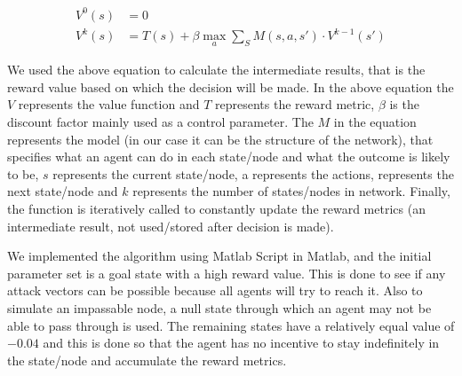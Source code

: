 \begin{equation} 
    \label{eq:infinite_horizon}
    \begin{aligned}
    V^0(s) &= 0 \\
    V^k(s) &= T(s) + \beta \max_a \sum_S M(s,a,s') \cdot V^{k-1}(s')
    \end{aligned}
\end{equation}


We used the above equation to calculate the intermediate results, that is the
reward value based on which the decision will be made. In the above equation the
\( V \) represents the value function and \( T \) represents the reward metric, $\beta$ is the
discount factor mainly used as a control parameter. The \(M\) in the equation
represents the model (in our case it can be the structure of the network), that specifies what an agent can do in each state/node and what the outcome
is likely to be, \(s\) represents the current state/node, a represents the actions,
represents the next state/node and \(k\) represents the number of states/nodes in
network. Finally, the function is iteratively called to constantly update the reward
metrics (an intermediate result, not used/stored after decision is made).

We implemented the algorithm using Matlab Script in Matlab, and the
initial parameter set is a goal state with a high
reward value. This is done to see if any attack vectors can be possible because
all agents will try to reach it. Also to simulate an impassable node, a null
state through which an agent may not be able to pass through is used. The
remaining states have a relatively equal value of \(-0.04\) and this is done so that the agent
has no incentive to stay indefinitely in the state/node and accumulate the
reward metrics.
 
